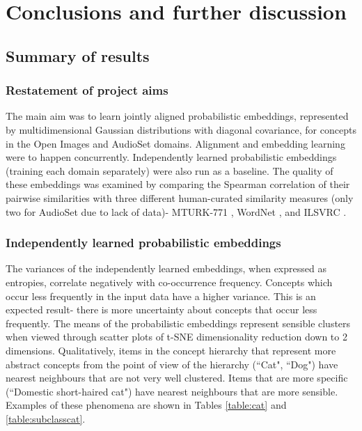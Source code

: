 \chapter{Conclusions and further discussion}

\section{Summary of results}

\subsection{Restatement of project aims}

The main aim was to learn jointly aligned probabilistic embeddings, represented by multidimensional Gaussian distributions with diagonal covariance, for concepts in the Open Images and AudioSet domains. Alignment and embedding learning were to happen concurrently. Independently learned probabilistic embeddings (training each domain separately) were also run as a baseline. The quality of these embeddings was examined by comparing the Spearman correlation of their pairwise similarities with three different human-curated similarity measures (only two for AudioSet due to lack of data)- MTURK-771 \cite{mturk771}, WordNet \cite{WordNet}, and ILSVRC \cite{RoadsLoveCVPR}. 

\subsection{Independently learned probabilistic embeddings}

The variances of the independently learned embeddings,  when expressed as entropies, correlate negatively with co-occurrence frequency. Concepts which occur less frequently in the input data have a higher variance. This is an expected result- there is more uncertainty about concepts that occur less frequently. The means of the probabilistic embeddings represent sensible clusters when viewed through scatter plots of t-SNE dimensionality reduction down to 2 dimensions. Qualitatively, items in the concept hierarchy that represent more abstract concepts from the point of view of the hierarchy (``Cat", ``Dog") have nearest neighbours that are not very well clustered. Items that are more specific (``Domestic short-haired cat")  have nearest neighbours that are more sensible. Examples of these phenomena are shown in Tables \ref{table:cat} and \ref{table:subclasscat}. 

